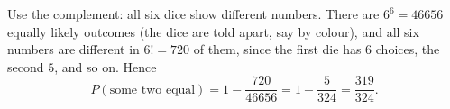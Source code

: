 Use the complement: all six dice show different numbers. There are $6^6=46656$ equally likely outcomes (the dice are told apart, say by colour), and all six numbers are different in $6!=720$ of them, since the first die has $6$ choices, the second $5$, and so on. Hence
\[
P(\text{some two equal})=1-\dfrac{720}{46656}=1-\dfrac{5}{324}=\boxed{\dfrac{319}{324}}.
\]
